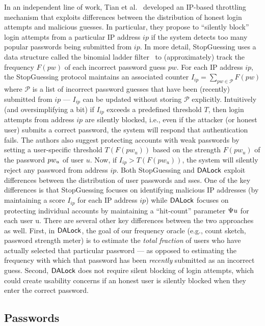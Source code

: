  In an independent line of work, Tian et al.~\cite{EuroSP:THS19} developed an IP-based throttling mechanism that exploits differences between the distribution of honest login attempts and malicious guesses. In particular, they propose to ``silently block'' login attempts from a particular IP address $ip$ if the system detects too many popular passwords being submitted from $ip$. In more detail, StopGuessing uses a data structure called the binomial ladder filter~\cite{SchHer:MSR18} to (approximately) track the frequency $F(pw)$ of each incorrect password guess $pw$. For each IP address $ip$, the StopGuessing protocol maintains an associated counter $I_{ip} = \displaystyle{\sum_{pw \in \mathcal{P}} F(pw)}$ where $\mathcal{P}$ is a list of incorrect password guesses that have been (recently) submitted from $ip$ --- $I_{ip} $ can be updated without storing $\mathcal{P}$ explicitly. Intuitively (and oversimplifying a bit) if $I_{ip}$ exceeds a predefined threshold $T$, then login attempts from address $ip$ are silently blocked, i.e., even if the attacker (or honest user) submits a correct password, the system will respond that authentication fails. The authors also suggest protecting accounts with weak passwords by setting a user-specific threshold $T(F(pw_{u}))$ based on the strength $F(pw_{u})$ of the password $pw_{u}$ of user $u$. Now, if $I_{ip} > T(F(pw_{u}))$, the system will silently reject any password from address $ip$. Both StopGuessing and $\mathsf{DALock}$ exploit differences between the distribution of user passwords and sses. One of the key differences is that StopGuessing focuses on identifying malicious IP addresses (by maintaining a score $I_{ip}$ for each IP address $ip$) while $\mathsf{DALock}$ focuses on protecting individual accounts by maintaining a ``hit-count'' parameter $\Psi{u}$ for each user u. There are several other key differences between the two approaches as well. First, in $\mathsf{DALock}$, the goal of our frequency oracle (e.g., count sketch, password strength meter) is to estimate the \textit{total fraction} of users who have actually selected that particular password --- as opposed to estimating the frequency with which that password has been {\em recently} submitted as an incorrect guess. Second, $\mathsf{DALock}$ does not require silent blocking of login attempts, which could create usability concerns if an honest user is silently blocked when they enter the correct password.  


\subsection{Passwords} \label{related: Passwords}  

